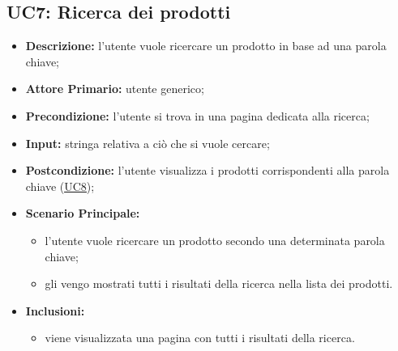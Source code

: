 
        \subsection{UC7: Ricerca dei prodotti}
        \label{sec:UC7}
        \begin{itemize}
            \item \textbf{Descrizione:} l'utente vuole ricercare un prodotto in base ad una parola chiave; 
            \item \textbf{Attore Primario:} utente generico;
            \item \textbf{Precondizione:} l'utente si trova in una pagina dedicata alla ricerca; 
            \item \textbf{Input:} stringa relativa a ciò che si vuole cercare;
            \item \textbf{Postcondizione:} l'utente visualizza i prodotti corrispondenti alla parola chiave (\hyperref[sec:UC8]{\underline{UC8}});
            \item \textbf{Scenario Principale:}
            \begin{itemize}
                \item l'utente vuole ricercare un prodotto secondo una determinata parola chiave;
                \item gli vengo mostrati tutti i risultati della ricerca nella lista dei prodotti.
            \end{itemize}
            \item \textbf{Inclusioni:}
            \begin{itemize}
                \item viene visualizzata una pagina con tutti i risultati della ricerca.
            \end{itemize}
        \end{itemize}